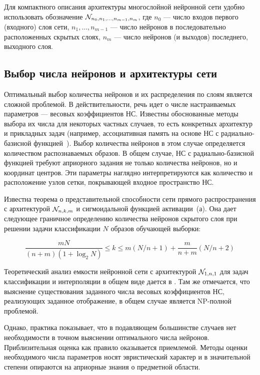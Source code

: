 Для компактного описания архитектуры многослойной нейронной сети
удобно использовать обозначение $\mathcal{N}_{n_0,n_1,\ldots,n_{m-1},n_m}$,
где $n_0$ --- число входов первого (входного) слоя сети,
$n_1,\ldots,n_{m-1}$ --- число нейронов в последовательно
расположенных скрытых слоях, $n_m$ --- число нейронов (и выходов)
последнего, выходного слоя.

\subsection{Выбор числа нейронов и архитектуры сети}

Оптимальный выбор количества нейронов и их распределения по слоям
является сложной проблемой.  В действительности, речь идет о числе
настраиваемых параметров --- весовых коэффициентов НС.  Известны
обоснованные методы выбора их числа для некоторых частных случаев, то
есть конкретных архитектур и прикладных задач (например, ассоциативная
память на основе НС с радиально-базисной функцией~\cite{koh80}).
Выбор количества нейронов в этом случае определяется количеством
распознаваемых образов.  В общем случае, НС с радиально-базисной
функцией требуют априорного задания не только количества нейронов, но
и координат центров.  Эти параметры наглядно интерпретируются как
количество и расположение узлов сетки, покрывающей входное
пространство НС.

Известна теорема  о представительной
способности сети прямого распространения с архитектурой $\mathcal{N}_{n,k,m}$
и сигмоидальной функцией активации~(а).  Она дает
следующее граничное определению количества нейронов скрытого слоя при
решении задачи классификации $N$ образов обучающей выборки:

\begin{equation}\label{eq:neuron-number}
\displaystyle\frac{mN}{(n+m)(1+\log_2N)} \le k \le
m(N/n+1)+\displaystyle\frac{m}{n+m}(N/n+2)
\end{equation}

Теоретический анализ емкости нейронной сети с архитектурой
$\mathcal{N}_{1,n,1}$ для задач классификации и интерполяции в общем виде
дается в \cite{sontag93}.  Там же отмечается, что выяснение
существования заданного числа весовых коэффициентов НС, реализующих
заданное отображение, в общем случае является NP-полной проблемой.

Однако, практика показывает, что в подавляющем большинстве случаев нет
необходимости в точном выяснении оптимального числа нейронов.
Приблизительная оценка как правило оказывается приемлемой.  Методы
оценки необходимого числа параметров носят эвристический характер и в
значительной степени опираются на априорные знания о предметной
области.

